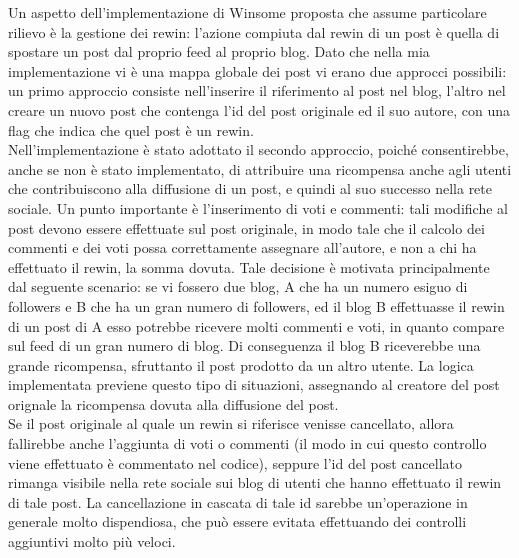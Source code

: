 \documentclass[a4paper,11pt]{article}
\begin{document}
	Un aspetto dell'implementazione di Winsome proposta che assume particolare rilievo è la gestione dei rewin: l'azione compiuta dal rewin di un post è quella di
	spostare un post dal proprio feed al proprio blog. 
	Dato che nella mia implementazione vi è una mappa globale dei post vi erano due approcci possibili: un primo approccio consiste nell'inserire il riferimento al post
	nel blog, l'altro nel creare un nuovo post che contenga l'id del post originale ed il suo autore, con una flag che indica che quel post è un rewin.\\
	Nell'implementazione è stato adottato il secondo approccio, poiché consentirebbe, anche se non è stato implementato, di attribuire una ricompensa anche agli utenti
	che contribuiscono alla diffusione di un post, e quindi al suo successo nella rete sociale. Un punto importante è l'inserimento di voti e commenti: tali modifiche
	al post devono essere effettuate sul post originale, in modo tale che il calcolo dei commenti e dei voti possa correttamente assegnare all'autore, e non a chi ha effettuato
	il rewin, la somma dovuta. Tale decisione è motivata principalmente dal seguente scenario: se vi fossero due blog, A che ha un numero esiguo di followers e B che ha un gran
	numero di followers, ed il blog B effettuasse il rewin di un post di A esso potrebbe ricevere molti commenti e voti, in quanto compare sul feed di un gran numero di blog.
	Di conseguenza il blog B riceverebbe una grande ricompensa, sfruttanto il post prodotto da un altro utente. La logica implementata previene questo tipo di situazioni, assegnando al creatore del post orignale la ricompensa dovuta alla diffusione del post.\\
	Se il post originale al quale un rewin si riferisce venisse cancellato, allora fallirebbe anche l'aggiunta di voti o commenti (il modo in cui questo controllo viene effettuato
	è commentato nel codice), seppure l'id del post cancellato rimanga visibile nella rete sociale sui blog di utenti che hanno effettuato il rewin di tale post.
	La cancellazione in cascata di tale id sarebbe un'operazione in generale molto dispendiosa, che può essere evitata effettuando dei controlli aggiuntivi molto più veloci.\\
	
	
	
	
	
	
	
	
	
	
\end{document}
